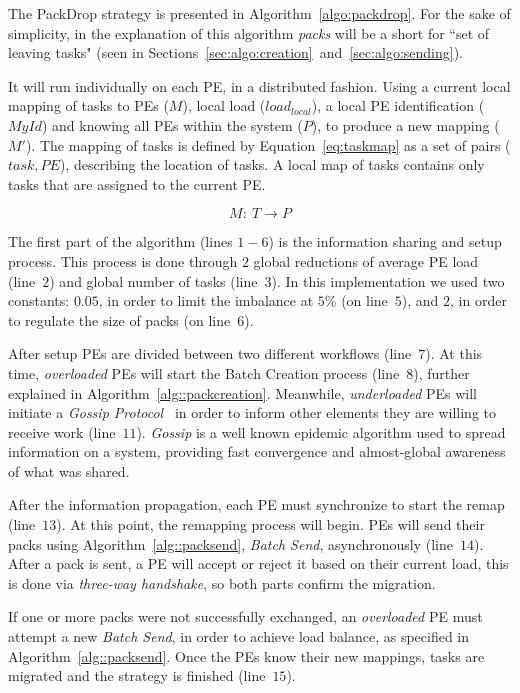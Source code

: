 The PackDrop strategy is presented in Algorithm~\ref{algo:packdrop}.
For the sake of simplicity, in the explanation of this algorithm \textit{packs} will be a short for ``set of leaving tasks" (seen in Sections~\ref{sec:algo:creation}~and~\ref{sec:algo:sending}).

It will run individually on each PE, in a distributed fashion. 
Using a current local mapping of tasks to PEs ($M$), local load ($load_{local}$), a local PE identification ($MyId$) and knowing all PEs within the system ($P$), to produce a new mapping ($M'$).
The mapping of tasks is defined by Equation~\ref{eq:taskmap} as a set of pairs ($task, PE$), describing the location of tasks.
A local map of tasks contains only tasks that are assigned to the current PE.

\begin{equation}
	M:\ T \rightarrow P
	\label{eq:taskmap}
\end{equation}

The first part of the algorithm (lines $1-6$) is the information sharing and setup process. 
This process is done through $2$ global reductions of average PE load (line~$2$) and global number of tasks (line~$3$).
In this implementation we used two constants: $0.05$, in order to limit the imbalance at $5\%$ (on line~$5$), and $2$, in order to regulate the size of packs (on line~$6$).

After setup PEs are divided between two different workflows (line~$7$).
At this time, \textit{overloaded} PEs will start the Batch Creation process (line~$8$), further explained in Algorithm~\ref{alg::packcreation}.
Meanwhile, \textit{underloaded} PEs will initiate a \textit{Gossip Protocol}~\cite{gossip} in order to inform other elements they are willing to receive work (line~$11$).
\textit{Gossip} is a well known epidemic algorithm used to spread information on a system, providing fast convergence and almost-global awareness of what was shared.

After the information propagation, each PE must synchronize to start the remap (line~$13$). 
At this point, the remapping process will begin.
PEs will send their packs using Algorithm~\ref{alg::packsend}, \textit{Batch Send}, asynchronously (line~$14$).
After a pack is sent, a PE will accept or reject it based on their current load, this is done via \textit{three-way handshake}, so both parts confirm the migration.

If one or more packs were not successfully exchanged, an \textit{overloaded} PE must attempt a new \textit{Batch Send}, in order to achieve load balance, as specified in Algorithm~\ref{alg::packsend}.
Once the PEs know their new mappings, tasks are migrated and the strategy is finished (line~$15$). 

